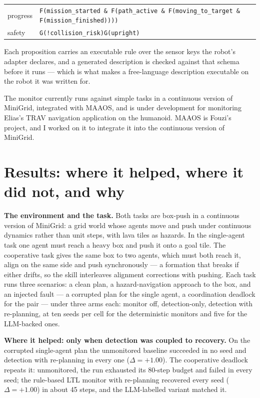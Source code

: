 \documentclass[11pt,a4paper]{article}
\begin{document}
\begin{center}\footnotesize
\begin{tabular}{@{}ll@{}}
progress & \texttt{F(mission\_started \& F(path\_active \& F(moving\_to\_target \& F(mission\_finished))))} \\
safety & \texttt{G(!collision\_risk)}\qquad \texttt{G(upright)} \\
\end{tabular}
\end{center}

\noindent
Each proposition carries an executable rule over the sensor keys the robot's adapter
declares, and a generated description is checked against that schema before it runs --- which
is what makes a free-language description executable on the robot it was written for.

The monitor currently runs against simple tasks in a continuous version of MiniGrid,
integrated with MAAOS, and is under development for monitoring Elias's TRAV navigation
application on the humanoid. MAAOS is Fouzi's project, and I worked on it to integrate it
into the continuous version of MiniGrid.

\section{Results: where it helped, where it did not, and why}

\textbf{The environment and the task.} Both tasks are box-push in a continuous version of
MiniGrid: a grid world whose agents move and push under continuous dynamics rather than unit
steps, with lava tiles as hazards. In the single-agent task one agent must reach a heavy box
and push it onto a goal tile. The cooperative task gives the same box to two agents, which
must both reach it, align on the same side and push synchronously --- a formation that breaks
if either drifts, so the skill interleaves alignment corrections with pushing. Each task runs
three scenarios: a clean plan, a hazard-navigation approach to the box, and an injected fault
--- a corrupted plan for the single agent, a coordination deadlock for the pair --- under
three arms each: monitor off, detection-only, detection with re-planning, at ten seeds per
cell for the deterministic monitors and five for the LLM-backed ones.

\textbf{Where it helped: only when detection was coupled to recovery.} On the corrupted
single-agent plan the unmonitored baseline succeeded in no seed and detection with
re-planning in every one ($\Delta = +1.00$). The cooperative deadlock repeats it:
unmonitored, the run exhausted its 80-step budget and failed in every seed; the rule-based
LTL monitor with re-planning recovered every seed ($\Delta = +1.00$) in about 45 steps, and
the LLM-labelled variant matched it.
\end{document}
